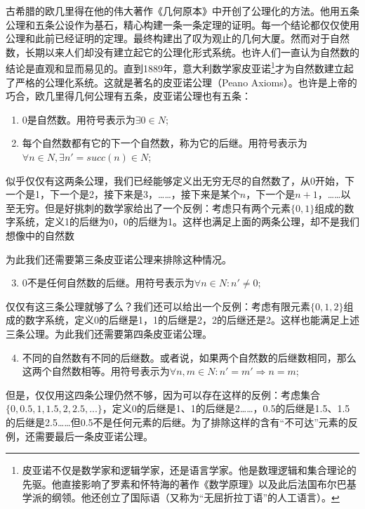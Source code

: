 \documentclass[UTF8]{article}
\begin{document}
古希腊的欧几里得在他的伟大著作《几何原本》中开创了公理化的方法。他用五条公理和五条公设作为基石，精心构建一条一条定理的证明。每一个结论都仅仅使用公理和此前已经证明的定理。最终构建出了叹为观止的几何大厦。然而对于自然数，长期以来人们却没有建立起它的公理化形式系统。也许人们一直认为自然数的结论是直观和显而易见的。直到1889年，意大利数学家皮亚诺\footnote{皮亚诺不仅是数学家和逻辑学家，还是语言学家。他是数理逻辑和集合理论的先驱。他直接影响了罗素和怀特海的著作《数学原理》以及此后法国布尔巴基学派的纲领。他还创立了国际语（又称为“无屈折拉丁语”的人工语言）。}才为自然数建立起了严格的公理化系统。这就是著名的皮亚诺公理（Peano Axioms）。也许是上帝的巧合，欧几里得几何公理有五条，皮亚诺公理也有五条：


\begin{enumerate}
\item 0是自然数。用符号表示为$\exists 0 \in N$;
\item 每个自然数都有它的下一个自然数，称为它的后继。用符号表示为$\forall n \in N, \exists n' = succ(n) \in N$;
\end{enumerate}

似乎仅仅有这两条公理，我们已经能够定义出无穷无尽的自然数了，从0开始，下一个是1，下一个是2，接下来是3，……，接下来是某个$n$，下一个是$n+1$，……以至无穷。但是好挑刺的数学家给出了一个反例：考虑只有两个元素$\{0, 1\}$组成的数字系统，定义1的后继为0，0的后继为1。这样也满足上面的两条公理，却不是我们想像中的自然数

为此我们还需要第三条皮亚诺公理来排除这种情况。

\begin{enumerate}
  \setcounter{enumi}{2}
  \item 0不是任何自然数的后继。用符号表示为$\forall n \in N: n' \neq 0$;
\end{enumerate}

仅仅有这三条公理就够了么？我们还可以给出一个反例：考虑有限元素$\{0, 1, 2\}$组成的数字系统，定义0的后继是1，1的后继是2，2的后继还是2。这样也能满足上述三条公理。为此我们还需要第四条皮亚诺公理。

\begin{enumerate}
  \setcounter{enumi}{3}
  \item 不同的自然数有不同的后继数。或者说，如果两个自然数的后继数相同，那么这两个自然数相等。用符号表示为$\forall n, m \in N: n' = m' \Rightarrow n = m$;
\end{enumerate}

但是，仅仅用这四条公理仍然不够，因为可以存在这样的反例：考虑集合$\{0, 0.5, 1, 1.5, 2, 2.5, ...\}$，定义0的后继是1、1的后继是2……，0.5的后继是1.5、1.5的后继是2.5……但0.5不是任何元素的后继。为了排除这样的含有“不可达”元素的反例，还需要最后一条皮亚诺公理。
\end{document}
